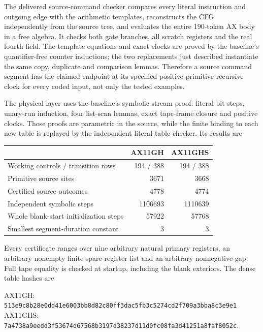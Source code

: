The delivered source-command checker compares every literal instruction
and outgoing edge with the arithmetic templates, reconstructs the CFG
independently from the source tree, and evaluates the entire 190-token AX
body in a free algebra.  It checks both gate branches, all scratch
registers and the real fourth field.  The template equations and exact
clocks are proved by the baseline's quantifier-free counter inductions;
the two replacements just described instantiate the same copy,
duplicate and comparison lemmas.  Therefore a source command segment
has the claimed endpoint at its specified positive primitive recursive
clock for every coded input, not only the tested examples.

The physical layer uses the baseline's symbolic-stream proof: literal
bit steps, unary-run induction, four list-scan lemmas, exact tape-frame
closure and positive clocks.  Those proofs are parametric in the
source, while the finite binding to each new table is replayed by the
independent literal-table checker.  Its results are
\begin{center}
\begin{tabular}{lrr}
\toprule
 & AX11GH & AX11GHS\\
\midrule
Working controls / transition rows &194 / 388&194 / 388\\
Primitive source sites &3671&3668\\
Certified source outcomes &4778&4774\\
Independent symbolic steps &1106693&1110639\\
Whole blank-start initialization steps &57922&57768\\
Smallest segment-duration constant &3&3\\
\bottomrule
\end{tabular}
\end{center}
Every certificate ranges over nine arbitrary natural primary registers,
an arbitrary nonempty finite spare-register list and an arbitrary
nonnegative gap.  Full tape equality is checked at startup, including
the blank exteriors.  The dense table hashes are
\begin{center}\small
AX11GH:\quad
\nolinkurl{513e9c8b28e0dd41e6003bb8d82c80ff3dac5fb3c5274cd2f709a3bba8c3e9e1}\\[3pt]
AX11GHS:\quad
\nolinkurl{7a4738a9eedd3f53674d67568b3197d38237d11d0fc08fa3d41251a8faf8052c}.
\end{center}

